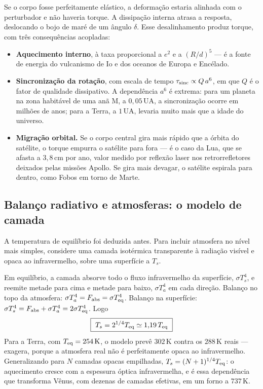 \documentclass[11pt,a4paper]{article}
\begin{document}
Se o corpo fosse perfeitamente elástico, a deformação estaria alinhada com o perturbador e não haveria torque. A dissipação interna atrasa a resposta, deslocando o bojo de maré de um ângulo $\delta$. Esse desalinhamento produz torque, com três consequências acopladas:

\begin{itemize}
\item \textbf{Aquecimento interno}, à taxa proporcional a $e^{2}$ e a $(R/d)^{5}$ --- é a fonte de energia do vulcanismo de Io e dos oceanos de Europa e Encélado.
\item \textbf{Sincronização da rotação}, com escala de tempo $\tau_{\rm sinc}\propto Q\,a^{6}$, em que $Q$ é o fator de qualidade dissipativo. A dependência $a^{6}$ é extrema: para um planeta na zona habitável de uma anã M, a $0{,}05\,\mathrm{UA}$, a sincronização ocorre em milhões de anos; para a Terra, a $1\,\mathrm{UA}$, levaria muito mais que a idade do universo.
\item \textbf{Migração orbital.} Se o corpo central gira mais rápido que a órbita do satélite, o torque empurra o satélite para fora --- é o caso da Lua, que se afasta a $3{,}8\,\mathrm{cm}$ por ano, valor medido por reflexão laser nos retrorrefletores deixados pelas missões Apollo. Se gira mais devagar, o satélite espirala para dentro, como Fobos em torno de Marte.
\end{itemize}

\subsection*{Balanço radiativo e atmosferas: o modelo de camada}

A temperatura de equilíbrio foi deduzida antes. Para incluir atmosfera no nível mais simples, considere uma camada isotérmica transparente à radiação visível e opaca ao infravermelho, sobre uma superfície a $T_s$.

Em equilíbrio, a camada absorve todo o fluxo infravermelho da superfície, $\sigma T_s^{4}$, e reemite metade para cima e metade para baixo, $\sigma T_a^{4}$ em cada direção. Balanço no topo da atmosfera: $\sigma T_a^{4}=F_{\rm abs}=\sigma T_{\rm eq}^{4}$. Balanço na superfície: $\sigma T_s^{4}=F_{\rm abs}+\sigma T_a^{4}=2\sigma T_{\rm eq}^{4}$. Logo
\[
\boxed{\ T_s=2^{1/4}T_{\rm eq}\simeq1{,}19\,T_{\rm eq}\ }
\]
Para a Terra, com $T_{\rm eq}=254\,\mathrm{K}$, o modelo prevê $302\,\mathrm{K}$ contra os $288\,\mathrm{K}$ reais --- exagera, porque a atmosfera real não é perfeitamente opaca ao infravermelho. Generalizando para $N$ camadas opacas empilhadas, $T_s=(N+1)^{1/4}T_{\rm eq}$: o aquecimento cresce com a espessura óptica infravermelha, e é essa dependência que transforma Vênus, com dezenas de camadas efetivas, em um forno a $737\,\mathrm{K}$.
\end{document}

